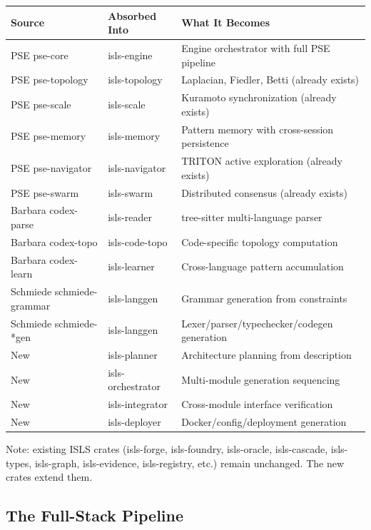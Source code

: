 \documentclass[11pt,a4paper]{article}
\begin{document}
\begin{center}
\small
\begin{tabular}{lll}
\toprule
\textbf{Source} & \textbf{Absorbed Into} & \textbf{What It Becomes} \\
\midrule
PSE pse-core & isls-engine & Engine orchestrator with full PSE pipeline \\
PSE pse-topology & isls-topology & Laplacian, Fiedler, Betti (already exists) \\
PSE pse-scale & isls-scale & Kuramoto synchronization (already exists) \\
PSE pse-memory & isls-memory & Pattern memory with cross-session persistence \\
PSE pse-navigator & isls-navigator & TRITON active exploration (already exists) \\
PSE pse-swarm & isls-swarm & Distributed consensus (already exists) \\
Barbara codex-parse & isls-reader & tree-sitter multi-language parser \\
Barbara codex-topo & isls-code-topo & Code-specific topology computation \\
Barbara codex-learn & isls-learner & Cross-language pattern accumulation \\
Schmiede schmiede-grammar & isls-langgen & Grammar generation from constraints \\
Schmiede schmiede-*gen & isls-langgen & Lexer/parser/typechecker/codegen generation \\
New & isls-planner & Architecture planning from description \\
New & isls-orchestrator & Multi-module generation sequencing \\
New & isls-integrator & Cross-module interface verification \\
New & isls-deployer & Docker/config/deployment generation \\
\bottomrule
\end{tabular}
\end{center}

Note: existing ISLS crates (isls-forge, isls-foundry, isls-oracle,
isls-cascade, isls-types, isls-graph, isls-evidence, isls-registry,
etc.) remain unchanged. The new crates extend them.

\subsection{The Full-Stack Pipeline}
\end{document}

